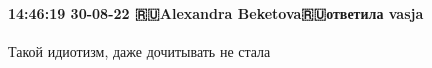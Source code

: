  
 
 
 
 

\paragraph{14:46:19 30-08-22 🇷🇺Alexandra Beketova🇷🇺ответила vasja}
Такой идиотизм, даже дочитывать не стала🤮🤮🤮
